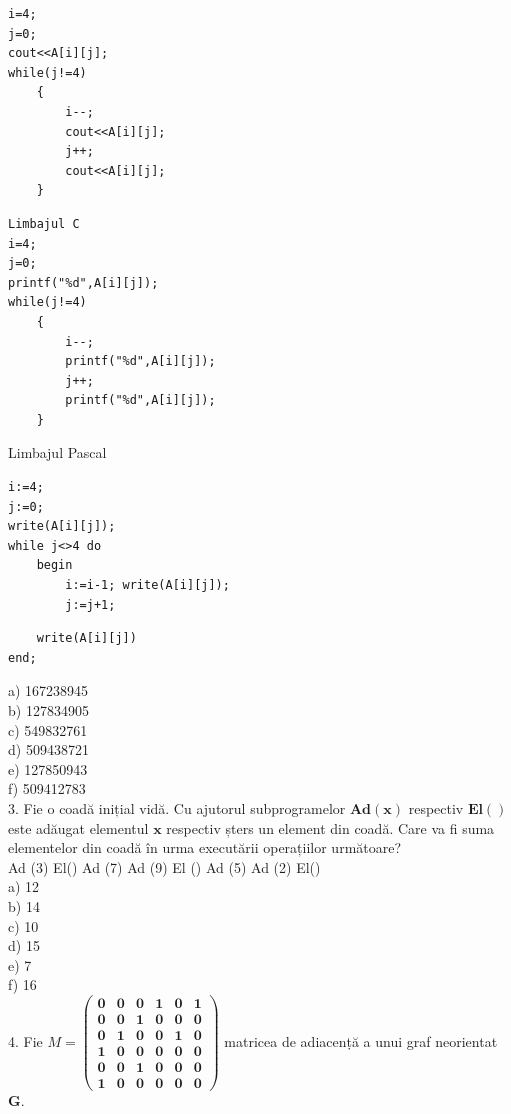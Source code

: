 \documentclass[10pt]{article}
\begin{document}
\begin{verbatim}
i=4;
j=0;
cout<<A[i][j];
while(j!=4)
    {
        i--;
        cout<<A[i][j];
        j++;
        cout<<A[i][j];
    }
\end{verbatim}

\begin{verbatim}
Limbajul C
i=4;
j=0;
printf("%d",A[i][j]);
while(j!=4)
    {
        i--;
        printf("%d",A[i][j]);
        j++;
        printf("%d",A[i][j]);
    }
\end{verbatim}

Limbajul Pascal

\begin{verbatim}
i:=4;
j:=0;
write(A[i][j]);
while j<>4 do
    begin
        i:=i-1; write(A[i][j]);
        j:=j+1;
\end{verbatim}

\begin{verbatim}
    write(A[i][j])
end;
\end{verbatim}

a) 167238945\\
b) 127834905\\
c) 549832761\\
d) 509438721\\
e) 127850943\\
f) 509412783\\
3. Fie o coadă inițial vidă. Cu ajutorul subprogramelor $\mathbf{A d}(\mathbf{x})$ respectiv $\mathbf{E l}()$ este adăugat elementul $\mathbf{x}$ respectiv șters un element din coadă. Care va fi suma elementelor din coadă în urma executării operațiilor următoare?\\
Ad (3) El() Ad (7) Ad (9) El () Ad (5) Ad (2) El()\\
a) 12\\
b) 14\\
c) 10\\
d) 15\\
e) 7\\
f) 16\\
4. Fie $M=\left(\begin{array}{llllll}\mathbf{0} & \mathbf{0} & \mathbf{0} & \mathbf{1} & \mathbf{0} & \mathbf{1} \\ \mathbf{0} & \mathbf{0} & \mathbf{1} & \mathbf{0} & \mathbf{0} & \mathbf{0} \\ \mathbf{0} & \mathbf{1} & \mathbf{0} & \mathbf{0} & \mathbf{1} & \mathbf{0} \\ \mathbf{1} & \mathbf{0} & \mathbf{0} & \mathbf{0} & \mathbf{0} & \mathbf{0} \\ \mathbf{0} & \mathbf{0} & \mathbf{1} & \mathbf{0} & \mathbf{0} & \mathbf{0} \\ \mathbf{1} & \mathbf{0} & \mathbf{0} & \mathbf{0} & \mathbf{0} & \mathbf{0}\end{array}\right)$ matricea de adiacenṭă a unui graf neorientat $\mathbf{G}$.
\end{document}
